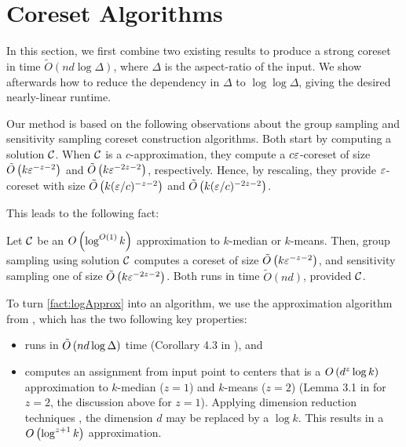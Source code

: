 \section{Coreset Algorithms}
\label{sec:theory}

In this section, we first combine two existing results to produce a strong coreset in time $\tilde{O}(nd \log \Delta)$, where $\Delta$ is the aspect-ratio of
the input.  We show afterwards how to reduce the dependency in $\Delta$ to $\log \log \Delta$, giving the desired nearly-linear runtime.

Our method is based on the following observations about the group sampling \cite{stoc21} and sensitivity sampling \cite{FeldmanL11} coreset construction
algorithms. Both start by computing a solution $\mathcal C$. When $\mathcal C$ is a $c$-approximation, they compute a $c \varepsilon$-coreset of size $\tilde O\left(
k \varepsilon^{-z-2}\right)$ and $\tilde O\left( k \varepsilon^{-2z -2}\right)$, respectively. Hence, by rescaling, they provide $\varepsilon$-coreset with size $\tilde O\left(
k (\varepsilon/c)^{-z-2}\right)$ and $\tilde O\left( k (\varepsilon/c)^{-2z-2}\right)$. 

This leads to the following fact:
\begin{fact}\label{fact:logApprox}
Let $\mathcal C$ be an $O\left( \log^{O(1)} k\right)$ approximation to $k$-median or $k$-means.
Then, group sampling using solution $\mathcal C$ computes a coreset of size $\tilde O\left(
k \varepsilon^{-z-2}\right)$, and sensitivity sampling one of size $\tilde O\left( k \varepsilon^{-2z-2}\right)$. 
Both runs in time $\tilde O(nd)$, provided $\mathcal C$.
\end{fact}

To turn \cref{fact:logApprox} into an algorithm, we use the \fkmeans approximation algorithm from \cite{cohen2020fast}, which has the two following key properties: 
\begin{itemize}
\item \fkmeans runs in $\tilde O\left( n d \log \Delta\right)$ time (Corollary 4.3 in \cite{cohen2020fast}), and
\item \fkmeans computes an assignment from input point to centers that is a $O\left( d^z \log k\right)$ approximation to $k$-median ($z=1$) and
$k$-means ($z=2$) (Lemma 3.1 in \cite{cohen2020fast} for $z=2$, the discussion above for $z=1$). Applying dimension reduction techniques \cite{MakarychevMR19}, the dimension $d$ may be replaced by a $\log k$. This results in a $O\left(\log^{z+1} k\right)$ approximation.
\end{itemize}


